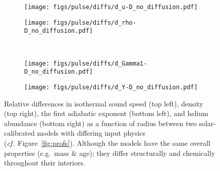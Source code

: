 \begin{figure}
    \centering
    \begin{subfigure}[b]{0.5\linewidth}
        \centering
        \texttt{[image: figs/pulse/diffs/d\_u-D\_no\_diffusion.pdf]}
    \end{subfigure}%
    \begin{subfigure}[b]{0.5\linewidth}
        \centering
        \texttt{[image: figs/pulse/diffs/d\_rho-D\_no\_diffusion.pdf]}%
    \end{subfigure}\\
    \begin{subfigure}[b]{0.5\linewidth}
        \centering
        \texttt{[image: figs/pulse/diffs/d\_Gamma1-D\_no\_diffusion.pdf]}%
    \end{subfigure}%
    \begin{subfigure}[b]{0.5\linewidth}
        \centering
        \texttt{[image: figs/pulse/diffs/d\_Y-D\_no\_diffusion.pdf]}%
    \end{subfigure}
    \caption[Structural differences between two solar models]{Relative differences in isothermal sound speed (top left), density (top right), the first adiabatic exponent (bottom left), and helium abundance (bottom right) as a function of radius between two solar-calibrated models with differing input physics (\emph{cf}.~Figure~\ref{fig:profs}). 
    Although the models have the same overall properties (e.g.\ mass \& age); they differ structurally and chemically throughout their interiors. %
    } 
    \label{fig:prof_diffs} 
\end{figure}




